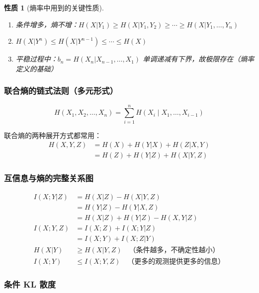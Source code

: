 \documentclass[12pt,a4paper]{ctexart}
\newtheorem{property}[theorem]{性质}
\theoremstyle{definition}
\begin{document}
\begin{property}[熵率中用到的关键性质]
\begin{enumerate}[label=(\arabic*),nosep]
  \item 条件增多，熵不增：$H(X|Y_1) \geq H(X|Y_1,Y_2) \geq \cdots \geq H(X|Y_1,\ldots,Y_n)$
  \item $H(X|Y^n) \leq H(X|Y^{n-1}) \leq \cdots \leq H(X)$
  \item 平稳过程中：$b_n = H(X_n|X_{n-1},\ldots,X_1)$ 单调递减有下界，故极限存在（熵率定义的基础）
\end{enumerate}
\end{property}

\subsubsection{联合熵的链式法则（多元形式）}

\[
H(X_1, X_2, \ldots, X_n) = \sum_{i=1}^{n} H(X_i \mid X_1, \ldots, X_{i-1})
\]

联合熵的两种展开方式都常用：
\begin{align*}
H(X, Y, Z) &= H(X) + H(Y|X) + H(Z|X, Y) \\
           &= H(Z) + H(Y|Z) + H(X|Y, Z)
\end{align*}

\subsubsection{互信息与熵的完整关系图}

\begin{keybox}[多变量关系速查]
\begin{align*}
I(X;Y|Z) &= H(X|Z) - H(X|Y,Z) \\
         &= H(Y|Z) - H(Y|X,Z) \\
         &= H(X|Z) + H(Y|Z) - H(X,Y|Z) \\[4pt]
I(X;Y,Z) &= I(X;Z) + I(X;Y|Z) \\
         &= I(X;Y) + I(X;Z|Y) \\[4pt]
H(X|Y) &\geq H(X|Y,Z) \quad \text{（条件越多，不确定性越小）} \\[4pt]
I(X;Y) &\leq I(X;Y,Z) \quad \text{（更多的观测提供更多的信息）}
\end{align*}
\end{keybox}

\subsubsection{条件 KL 散度}
\end{document}
